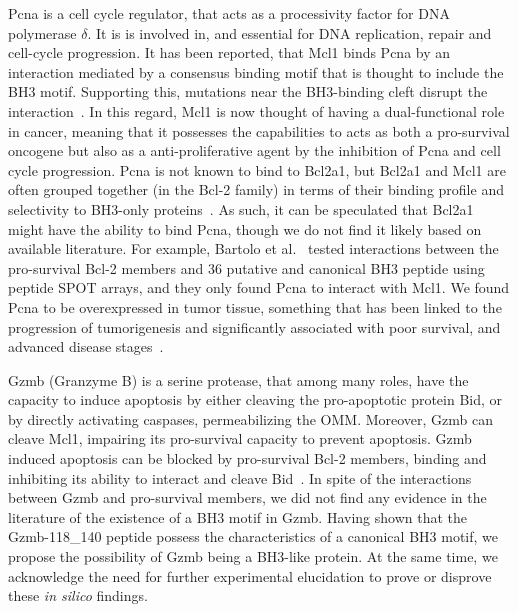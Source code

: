 \documentclass[10pt,letterpaper]{article}
\begin{document}
Pcna is a cell cycle regulator, that acts as a processivity factor for DNA polymerase $\delta$. It is is involved in, and essential for DNA replication, repair and cell-cycle progression. It has been reported, that Mcl1 binds Pcna by an interaction mediated by a consensus binding motif that is thought to include the BH3 motif. Supporting this, mutations near the BH3-binding cleft disrupt the interaction~\cite{DeBartolo2014}. In this regard, Mcl1 is now thought of having a dual-functional role in cancer, meaning that it possesses the capabilities to acts as both a pro-survival oncogene but also as a anti-proliferative agent by the inhibition of Pcna and cell cycle progression. Pcna is not known to bind to Bcl2a1, but Bcl2a1 and Mcl1 are often grouped together (in the Bcl-2 family) in terms of their binding profile and selectivity to BH3-only proteins~\cite{Vogler2012}. As such, it can be speculated that Bcl2a1 might have the ability to bind Pcna, though we do not find it likely based on available literature. For example, Bartolo et al.~\cite{DeBartolo2014} tested interactions between the pro-survival Bcl-2 members and 36 putative and canonical BH3 peptide using peptide SPOT arrays, and they only found Pcna to interact with Mcl1. We found Pcna to be overexpressed in tumor tissue, something that has been linked to the progression of tumorigenesis and significantly associated with poor survival, and advanced disease stages~\cite{Qiongying2016}.

Gzmb (Granzyme B) is a serine protease, that among many roles, have the capacity to induce apoptosis by either cleaving the pro-apoptotic protein Bid, or by directly activating caspases, permeabilizing the OMM. Moreover, Gzmb can cleave Mcl1, impairing its pro-survival capacity to prevent apoptosis. Gzmb induced apoptosis can be blocked by pro-survival Bcl-2 members, binding and inhibiting its ability to interact and cleave Bid~\cite{Thomas2010, Sutton2012}. 
In spite of the interactions between Gzmb and pro-survival members, we did not find any evidence in the literature of the existence of a BH3 motif in Gzmb. Having shown that the Gzmb-118\_140 peptide possess the characteristics of a canonical BH3 motif, we propose the possibility of Gzmb being a BH3-like protein. At the same time, we acknowledge the need for further experimental elucidation to prove or disprove these \textit{in silico} findings.
\end{document}
